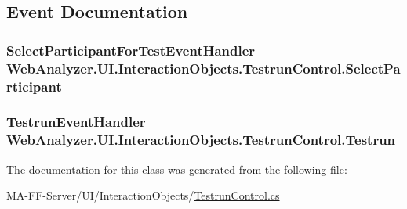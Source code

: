 \subsection{Event Documentation}
\hypertarget{class_web_analyzer_1_1_u_i_1_1_interaction_objects_1_1_testrun_control_abf256e52c1a039ca329f7c749a9087e4}{}
\subsubsection[{Select\+Participant}]{\setlength{\rightskip}{0pt plus 5cm}Select\+Participant\+For\+Test\+Event\+Handler Web\+Analyzer.\+U\+I.\+Interaction\+Objects.\+Testrun\+Control.\+Select\+Participant}\label{class_web_analyzer_1_1_u_i_1_1_interaction_objects_1_1_testrun_control_abf256e52c1a039ca329f7c749a9087e4}
\hypertarget{class_web_analyzer_1_1_u_i_1_1_interaction_objects_1_1_testrun_control_aec90f2bc94369619608e0059453752d3}{}
\subsubsection[{Testrun}]{\setlength{\rightskip}{0pt plus 5cm}Testrun\+Event\+Handler Web\+Analyzer.\+U\+I.\+Interaction\+Objects.\+Testrun\+Control.\+Testrun}\label{class_web_analyzer_1_1_u_i_1_1_interaction_objects_1_1_testrun_control_aec90f2bc94369619608e0059453752d3}


The documentation for this class was generated from the following file\+:\begin{DoxyCompactItemize}
\item 
M\+A-\/\+F\+F-\/\+Server/\+U\+I/\+Interaction\+Objects/\hyperlink{_testrun_control_8cs}{Testrun\+Control.\+cs}\end{DoxyCompactItemize}
